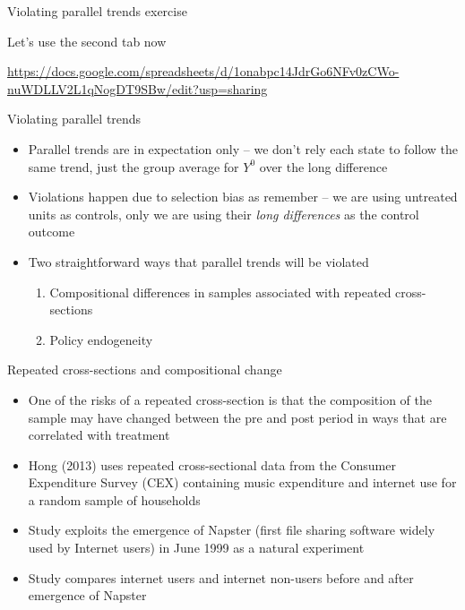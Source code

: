 \documentclass{beamer}
\begin{document}
\begin{frame}{Violating parallel trends exercise}

Let's use the second tab now 

\url{https://docs.google.com/spreadsheets/d/1onabpc14JdrGo6NFv0zCWo-nuWDLLV2L1qNogDT9SBw/edit?usp=sharing}

\end{frame}


\begin{frame}{Violating parallel trends}

\begin{itemize}
\item Parallel trends are in expectation only -- we don't rely each state to follow the same trend, just the group average for $Y^0$ over the long difference
\item Violations happen due to selection bias as remember -- we are using untreated units as controls, only we are using their \emph{long differences} as the control outcome
\item Two straightforward ways that parallel trends will be violated
	\begin{enumerate}
	\item Compositional differences in samples associated with repeated cross-sections
	\item Policy endogeneity
	\end{enumerate}
\end{itemize}

\end{frame}



\begin{frame}{Repeated cross-sections and compositional change}
	
	\begin{itemize}
	\item One of the risks of a repeated cross-section is that the composition of the sample may have changed between the pre and post period in ways that are correlated with treatment
	\item Hong (2013) uses repeated cross-sectional data from the Consumer Expenditure Survey (CEX) containing music expenditure and internet use for a random sample of households
	\item Study exploits the emergence of Napster (first file sharing software widely used by Internet users) in June 1999 as a natural experiment
	\item Study compares internet users and internet non-users before and after emergence of Napster
	\end{itemize}

\end{frame}
\end{document}
